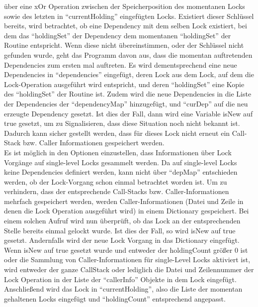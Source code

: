 über eine xOr Operation zwischen der Speicherposition des momentanen Locks 
sowie des letzten in ``currentHolding'' eingefügten Locks. Existiert dieser 
Schlüssel bereits, wird betrachtet, ob eine Dependency mit dem selben Lock
existiert, bei dem das ``holdingSet'' der Dependency dem momentanen ``holdingSet''
der Routine entspricht. Wenn diese nicht übereinstimmen, oder der Schlüssel
nicht gefunden wurde, geht das Programm davon aus, dass die momentan auftretenden
Dependencies zum ersten mal auftreten. Es wird dementsprechend eine neue
Dependencies in ``dependencies'' eingefügt, deren Lock aus dem Lock, auf dem die
Lock-Operation ausgeführt wird entspricht, und deren ``holdingSet'' eine 
Kopie des ``holdingSet'' der Routine ist. Zudem wird die neue Dependencies
in die Liste der Dependencies der ``dependencyMap'' hinzugefügt, und ``curDep''
auf die neu erzeugte Dependency gesetzt. Ist dies der Fall, dann wird eine 
Variable isNew auf true gesetzt, um zu Signalisieren, dass diese Situation 
noch nicht bekannt ist.
Dadurch kann sicher gestellt werden, dass für dieses Lock nicht erneut 
ein Call-Stack bzw. Caller Informationen gespeichert werden.\\
Es ist möglich in den Optionen einzustellen, dass Informationen über Lock 
Vorgänge auf single-level Locks gesammelt werden. Da auf single-level Locks keine
Dependencies definiert werden, kann nicht über ``depMap'' entschieden werden, 
ob der Lock-Vorgang schon einmal betrachtet worden ist. Um zu verhindern, dass 
der entsprechende Call-Stacks bzw. Caller-Informationen mehrfach gespeichert 
werden, werden Caller-Informationen (Datei und Zeile in denen die Lock Operation 
ausgeführt wird) in einem Dictionary gespeichert. Bei einem solchen Aufruf wird
nun überprüft, ob das Lock an der entsprechenden Stelle bereits einmal gelockt 
wurde. Ist dies der Fall, so wird isNew auf true gesetzt. Andernfalls wird der 
neue Lock Vorgang in das Dictionary eingefügt.\\
Wenn isNew auf true gesetzt wurde und entweder der holdingCount größer 0 ist 
oder die Sammlung von Caller-Informationen für single-Level Locks aktiviert ist,
wird entweder der ganze CallStack oder lediglich die Datei und Zeilennummer der 
Lock Operation in der Liste der ``callerInfo'' Objekte in dem Lock eingefügt.
Anschließend wird das Lock in ``currentHolding'', also die Liste der momentan
gehaltenen Locks eingefügt und ``holdingCount'' entsprechend angepasst.


